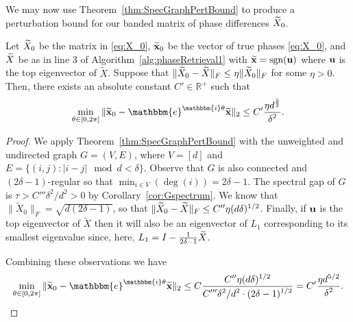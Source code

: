 We may now use Theorem~\ref{thm:SpecGraphPertBound} to produce a perturbation bound for our banded matrix of phase differences $\widetilde{X}_0$.%

\begin{cor}
Let $\widetilde{X}_0$ be the matrix in \eqref{eq:X_0}, $\widetilde{\mathbf x}_0$ be the vector of true phases \eqref{eq:X_0}, and $\widetilde{X}$ be as in line 3 of Algorithm~\ref{alg:phaseRetrieval1} with $\widetilde{\mathbf x} = \mathrm{sgn}({\bf u})$ where ${\bf u}$ is the top eigenvector of $\widetilde{X}$. Suppose that 
$\Vert \widetilde{X}_0 - \widetilde{X} \Vert_F \le \eta \Vert \widetilde{X}_0 \Vert_F$ for some $\eta>0$.  Then, there exists an absolute constant $C' \in \mathbb{R}^+$ such that
\[\min_{\theta\in[0,2\pi]} \Vert \tx_0 - \mathbbm{e}^{\mathbbm{i}\theta} \tx \Vert_2 \le C' \bigfrac{\eta d^\frac{5}{2}}{\delta^{2}}.\]
\label{cor:GenBoundv2}
\end{cor}

\begin{proof}
 We apply Theorem~\ref{thm:SpecGraphPertBound} with the unweighted and undirected graph $G = (V, E)$, where $V = [d]$ and $E = \{(i, j) : |i - j| \mod d < \delta\}$.  Observe that $G$ is also connected and $(2\delta - 1)$-regular so that $\min_{i \in V}(\deg(i)) = 2\delta - 1$.  The spectral gap of $G$ is $\tau > C'''\delta^2 / d^2 > 0$ by Corollary~\ref{cor:Gspectrum}.  We know that $\| \widetilde{X}_0 \|_F = \sqrt{d(2\delta - 1)}$, so that $\| \widetilde{X}_0 - \widetilde{X} \|_{F} \le C'' \eta (d \delta)^{1/2}$.  Finally, if ${\bf u}$ is the top eigenvector of $\widetilde{X}$ then it will also be an eigenvector of $L_1$ corresponding to its smallest eigenvalue since, here, $L_1 = I - \frac{1}{2 \delta - 1} \widetilde{X} $.

Combining these observations we have \[\min_{\theta\in[0,2\pi]} \Vert \tx_0 - \mathbbm{e}^{\mathbbm{i}\theta} \tx \Vert_2 \le C \bigfrac{C'' \eta (d \delta)^{1/2}}{C''' \delta^2 / d^2 \cdot (2 \delta - 1)^{1/2}} = C' \bigfrac{\eta d^{5/2}}{\delta^2}.\]
\end{proof}
